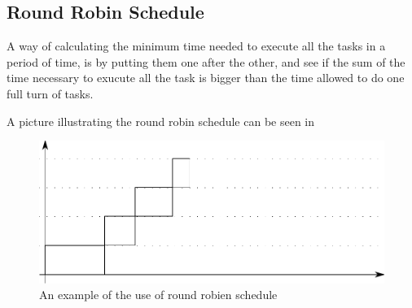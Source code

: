 \subsection{Round Robin Schedule}
A way of calculating the minimum time needed to execute all the tasks in a period of time, is by putting them one after the other, and see if the sum of the time necessary to exucute all the task is bigger than the time allowed to do one full turn of tasks.

A picture illustrating the round robin schedule can be seen in 

 \begin{figure}[H]
	\centering
	\includegraphics[scale=0.8]{figures/roundRobinSchedule.pdf}
	\caption{An example of the use of round robien schedule}
	\label{roundRobinSchedule}
\end{figure}


